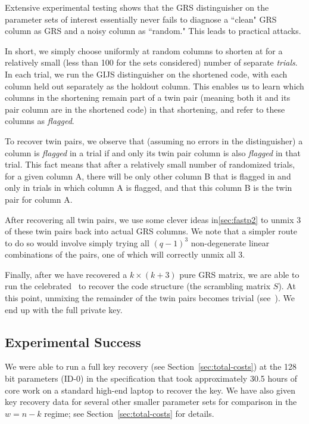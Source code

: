 Extensive experimental testing shows that the GRS distinguisher on the
parameter sets of interest essentially never fails to diagnose a ``clean" GRS
column as GRS and a noisy column as ``random." This leads to practical attacks.

In short, we simply choose uniformly at random columns to shorten at for a
relatively small (less than 100 for the sets considered) number of separate
\emph{trials}. In each trial, we run the GIJS distinguisher on the shortened
code, with each column held out separately as the holdout column. This enables
us to learn which columns in the shortening remain part of a twin pair (meaning
both it and its pair column are in the shortened code) in that shortening, and
refer to these columns as \emph{flagged}.

To recover twin pairs, we observe that (assuming no errors in the
distinguisher) a column is \emph{flagged} in a trial if and only its twin pair
column is also \emph{flagged} in that trial. This fact means that after a
relatively small number of randomized trials, for a given column A, there will
be only other column B that is flagged in and only in trials in which column A
is flagged, and that this column B is the twin pair for column A.

After recovering all twin pairs, we use some clever ideas in\ref{sec:fastp2} to
unmix 3 of these twin pairs back into actual GRS columns. We note that a
simpler route to do so would involve simply trying all $(q-1)^3$ non-degenerate
linear combinations of the pairs, one of which will correctly unmix all 3.

Finally, after we have recovered a $k \times (k+3)$ pure GRS matrix, we are able to
run the celebrated~\cite{sidelnikov1992insecurity} to recover the code
structure (the scrambling matrix $S$). At this point, unmixing the remainder of the twin pairs
becomes trivial (see~\cite{CLT18}). We end up with the full private key.

\subsection{Experimental Success}\label{sec:exp-success}

We were able to run a full key recovery (see Section~\ref{sec:total-costs}) at
the 128 bit parameters (ID-0) in the specification that took approximately 30.5
hours of core work on a standard high-end laptop to recover the key. We have
also given key recovery data for several other smaller parameter sets for
comparison in the $w=n-k$ regime; see Section~\ref{sec:total-costs} for
details.


